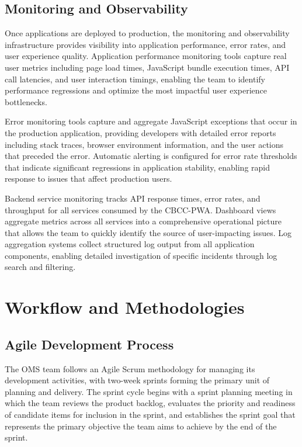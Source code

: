 \subsection{Monitoring and Observability}

Once applications are deployed to production, the monitoring and observability infrastructure provides visibility into application performance, error rates, and user experience quality. Application performance monitoring tools capture real user metrics including page load times, JavaScript bundle execution times, API call latencies, and user interaction timings, enabling the team to identify performance regressions and optimize the most impactful user experience bottlenecks.

Error monitoring tools capture and aggregate JavaScript exceptions that occur in the production application, providing developers with detailed error reports including stack traces, browser environment information, and the user actions that preceded the error. Automatic alerting is configured for error rate thresholds that indicate significant regressions in application stability, enabling rapid response to issues that affect production users.

Backend service monitoring tracks API response times, error rates, and throughput for all services consumed by the CBCC-PWA. Dashboard views aggregate metrics across all services into a comprehensive operational picture that allows the team to quickly identify the source of user-impacting issues. Log aggregation systems collect structured log output from all application components, enabling detailed investigation of specific incidents through log search and filtering.

\section{Workflow and Methodologies}

\subsection{Agile Development Process}

The OMS team follows an Agile Scrum methodology for managing its development activities, with two-week sprints forming the primary unit of planning and delivery. The sprint cycle begins with a sprint planning meeting in which the team reviews the product backlog, evaluates the priority and readiness of candidate items for inclusion in the sprint, and establishes the sprint goal that represents the primary objective the team aims to achieve by the end of the sprint.

